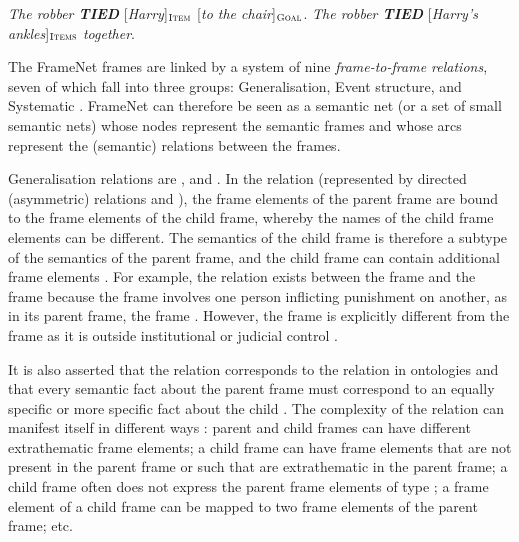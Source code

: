 \documentclass[output=paper,colorlinks,citecolor=brown]{langscibook}
\begin{document}
 \begin{exe}
 \ex  \label{ch01:ex:01}
  \textit{The robber \textbf{TIED}} [\textit{Harry}]$_{\text{\textsc{Item}}}$ [\textit{to the chair}]$_{\text{\textsc{Goal}}}$.
 \ex  \label{ch01:ex:02}
  \textit{The robber \textbf{TIED}} [\textit{Harry's ankles}]$_{\text{\textsc{Items}}}$ \textit{together}.
\end{exe}


The FrameNet frames are linked by a system of nine \emph{frame-to-frame relations}, seven of which fall into three groups: Generalisation, Event structure, and Systematic \citep[806-807]{fillmore2010}.  
FrameNet can therefore be seen as a semantic net (or a set of small semantic nets) whose nodes represent the semantic frames and whose arcs represent the (semantic) relations between the frames.

Generalisation relations are ,  and . In the relation  (represented by directed (asymmetric) relations  and ), the frame elements of the parent frame are bound to the frame elements of the child frame, whereby the names of the child frame elements can be different. The semantics of the child frame is therefore a subtype of the semantics of the parent frame, and the child frame can contain additional frame elements \citep[330]{fillmore2010}. For example, the  relation exists between the frame  and the frame  because the frame  involves one person inflicting punishment on another, as in its parent frame, the frame . However, the frame  is explicitly different from the frame  as it is outside institutional or judicial control \citep[330]{fillmore2010}.

It is also asserted that the  relation corresponds to the  relation in ontologies and that every semantic fact about the parent frame must correspond to an equally specific or more specific fact about the child \citep[80]{Ruppenhofer2016}. The complexity of the  relation can manifest itself in different ways \citep[81]{Ruppenhofer2016}: parent and child frames can have different extrathematic frame elements; a child frame can have frame elements that are not present in the parent frame or such that are extrathematic in the parent frame; a child frame often does not express the parent frame elements of type ; a frame element of a child frame can be mapped to two frame elements of the parent frame; etc.
\end{document}

